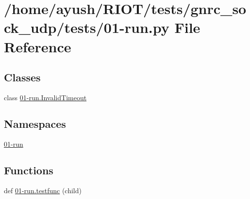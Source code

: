 \hypertarget{gnrc__sock__udp_2tests_201-run_8py}{}\section{/home/ayush/\+R\+I\+O\+T/tests/gnrc\+\_\+sock\+\_\+udp/tests/01-\/run.py File Reference}
\label{gnrc__sock__udp_2tests_201-run_8py}
\subsection*{Classes}
\begin{DoxyCompactItemize}
\item 
class \hyperlink{class01-run_1_1InvalidTimeout}{01-\/run.\+Invalid\+Timeout}
\end{DoxyCompactItemize}
\subsection*{Namespaces}
\begin{DoxyCompactItemize}
\item 
 \hyperlink{namespace01-run}{01-\/run}
\end{DoxyCompactItemize}
\subsection*{Functions}
\begin{DoxyCompactItemize}
\item 
def \hyperlink{namespace01-run_aff983ffd4ab0e6bf8e7e58970e4a10bb}{01-\/run.\+testfunc} (child)
\end{DoxyCompactItemize}
